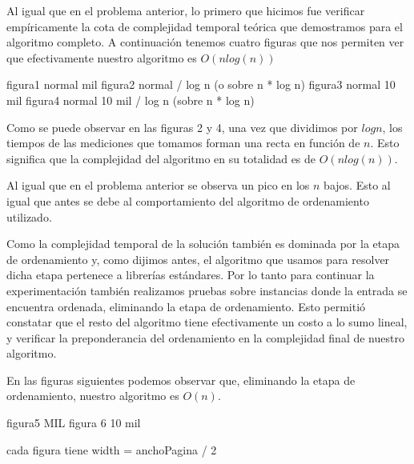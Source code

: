 Al igual que en el problema anterior, lo primero que hicimos fue verificar empíricamente la cota de complejidad temporal teórica que demostramos para el algoritmo completo. 
A continuación tenemos cuatro figuras que nos permiten ver que efectivamente nuestro algoritmo es $O(n log(n))$

figura1 normal mil
figura2 normal / log n (o sobre n * log n)
figura3 normal 10 mil
figura4 normal 10 mil / log n (sobre n * log n)

Como se puede observar en las figuras 2 y 4, una vez que dividimos por $log n$, los tiempos de las mediciones que tomamos forman una recta en función de $n$. Esto significa que la complejidad del algoritmo en su totalidad es de $O(n log(n))$.

Al igual que en el problema anterior se observa un pico en los $n$ bajos. Esto al igual que antes se debe al comportamiento del algoritmo de ordenamiento utilizado.

Como la complejidad temporal de la solución también es dominada por la etapa de ordenamiento y, como dijimos antes, el algoritmo que usamos para resolver dicha etapa pertenece a librerías estándares. Por lo tanto para continuar la experimentación también realizamos pruebas sobre instancias donde la entrada se encuentra ordenada, eliminando la etapa de ordenamiento. Esto permitió constatar que el resto del algoritmo tiene efectivamente un costo a lo sumo lineal, y verificar la preponderancia del ordenamiento en la complejidad final de nuestro algoritmo.

En las figuras siguientes podemos observar que, eliminando la etapa de ordenamiento, nuestro algoritmo es $O(n)$.

figura5 MIL
figura 6 10 mil

cada figura tiene width = anchoPagina / 2